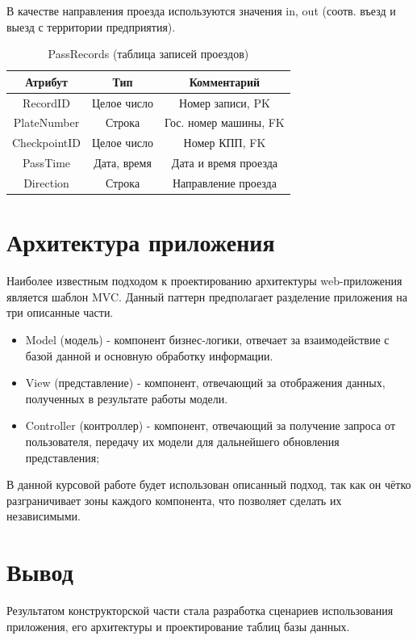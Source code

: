 В качестве направления проезда используются значения in, out (соотв. въезд и выезд с территории предприятия).
\newpage
\begin{table}[h!] 
	\begin{center}
		\caption{PassRecords (таблица записей проездов)}
		\label{pass_table}
		\begin{tabular}{| c | c | c |}
			\hline
			\textbf{Атрибут}		&	\textbf{Тип}		& \textbf{Комментарий} \\
			\hline
			RecordID	&	Целое число	&	Номер записи, PK \\ \hline
			PlateNumber	&	Строка		&	Гос. номер машины, FK \\ \hline
			CheckpointID &	Целое число	&	Номер КПП, FK \\ \hline
			PassTime 	&	Дата, время	&	Дата и время проезда \\ \hline
			Direction 	&	Строка		&	Направление проезда \\ \hline
		\end{tabular}
	\end{center}
\end{table}

\section{Архитектура приложения}
Наиболее известным подходом к проектированию архитектуры web-приложения является шаблон MVC. Данный паттерн предполагает разделение приложения на три описанные части.
\begin{itemize}
	\item Model (модель) - компонент бизнес-логики, отвечает за взаимодействие с базой данной и основную обработку информации.
	\item View (представление) - компонент, отвечающий за отображения данных, полученных в результате работы модели.
	\item Controller (контроллер) - компонент, отвечающий за получение запроса от пользователя, передачу их модели для дальнейшего обновления представления;
\end{itemize}

В данной курсовой работе будет использован описанный подход, так как он чётко разграничивает зоны каждого компонента, что позволяет сделать их независимыми.


\section*{Вывод}
Результатом конструкторской части стала разработка сценариев использования приложения, его архитектуры и проектирование таблиц базы данных.



